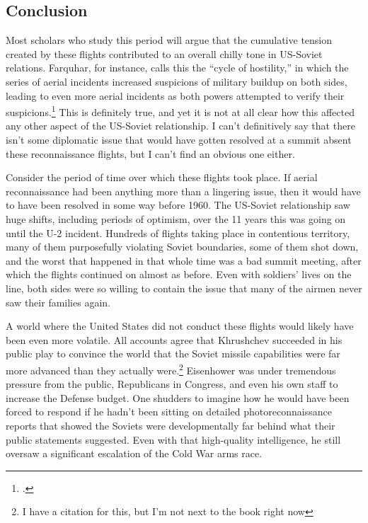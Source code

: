 \documentclass{report}
\begin{document}
\begin{refsegment}
\section{Conclusion}
Most scholars who study this period will argue that the cumulative tension created by these flights contributed to an overall chilly tone in US-Soviet relations. Farquhar, for instance, calls this the ``cycle of hostility,'' in which the series of aerial incidents increased suspicions of military buildup on both sides, leading to even more aerial incidents as both powers attempted to verify their suspicions.\footcite[p.~43]{farquhar_aerial_2015} This is definitely true, and yet it is not at all clear how this affected any other aspect of the US-Soviet relationship. I can't definitively say that there isn't some diplomatic issue that would have gotten resolved at a summit absent these reconnaissance flights, but I can't find an obvious one either.

Consider the period of time over which these flights took place. If aerial reconnaissance had been anything more than a lingering issue, then it would have to have been resolved in some way before 1960. The US-Soviet relationship saw huge shifts, including periods of optimism, over the 11 years this was going on until the U-2 incident. Hundreds of flights taking place in contentious territory, many of them purposefully violating Soviet boundaries, some of them shot down, and the worst that happened in that whole time was a bad summit meeting, after which the flights continued on almost as before. Even with soldiers' lives on the line, both sides were so willing to contain the issue that many of the airmen never saw their families again.

A world where the United States did not conduct these flights would likely have been even more volatile. All accounts agree that Khrushchev succeeded in his public play to convince the world that the Soviet missile capabilities were far more advanced than they actually were.\footnote{I have a citation for this, but I'm not next to the book right now} Eisenhower was under tremendous pressure from the public, Republicans in Congress, and even his own staff to increase the Defense budget. One shudders to imagine how he would have been forced to respond if he hadn't been sitting on detailed photoreconnaissance reports that showed the Soviets were developmentally far behind what their public statements suggested. Even with that high-quality intelligence, he still oversaw a significant escalation of the Cold War arms race.


\end{refsegment}
\end{document}
